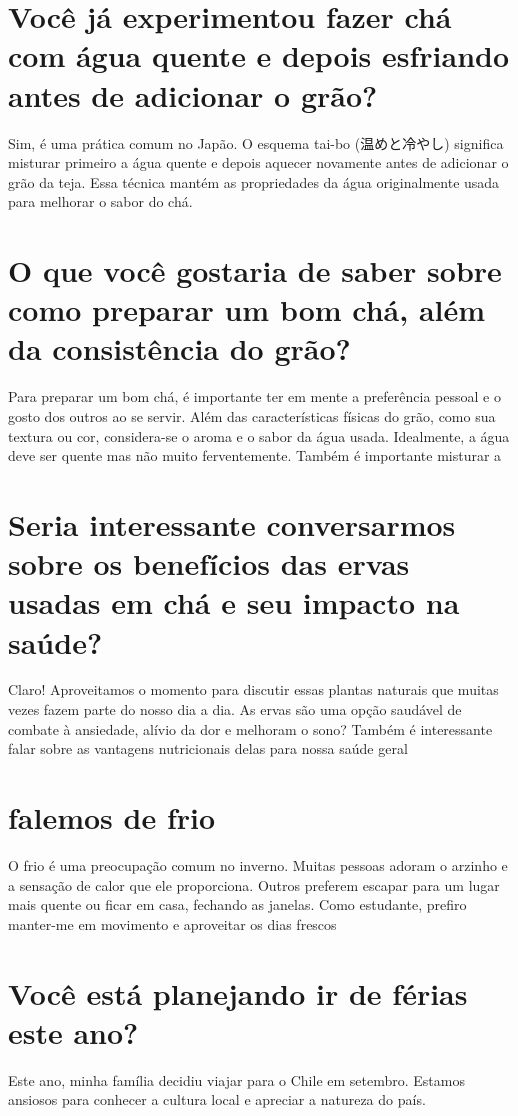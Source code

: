 \documentclass[11pt,a4paper]{article}
\begin{document}
\section{Você já experimentou fazer chá com água quente e depois esfriando antes de adicionar o grão?}
Sim, é uma prática comum no Japão. O esquema tai-bo (温めと冷やし) significa misturar primeiro a água quente e depois aquecer novamente antes de adicionar o grão da teja. Essa técnica mantém as propriedades da água originalmente usada para melhorar o sabor do chá.

\section{O que você gostaria de saber sobre como preparar um bom chá, além da consistência do grão?}
Para preparar um bom chá, é importante ter em mente a preferência pessoal e o gosto dos outros ao se servir. Além das características físicas do grão, como sua textura ou cor, considera-se o aroma e o sabor da água usada. Idealmente, a água deve ser quente mas não muito ferventemente. Também é importante misturar a

\section{Seria interessante conversarmos sobre os benefícios das ervas usadas em chá e seu impacto na saúde?}
Claro! Aproveitamos o momento para discutir essas plantas naturais que muitas vezes fazem parte do nosso dia a dia. As ervas são uma opção saudável de combate à ansiedade, alívio da dor e melhoram o sono? Também é interessante falar sobre as vantagens nutricionais delas para nossa saúde geral

\section{falemos de frio}
O frio é uma preocupação comum no inverno. Muitas pessoas adoram o arzinho e a sensação de calor que ele proporciona. Outros preferem escapar para um lugar mais quente ou ficar em casa, fechando as janelas. Como estudante, prefiro manter-me em movimento e aproveitar os dias frescos

\section{Você está planejando ir de férias este ano?}
Este ano, minha família decidiu viajar para o Chile em setembro. Estamos ansiosos para conhecer a cultura local e apreciar a natureza do país.
\end{document}
